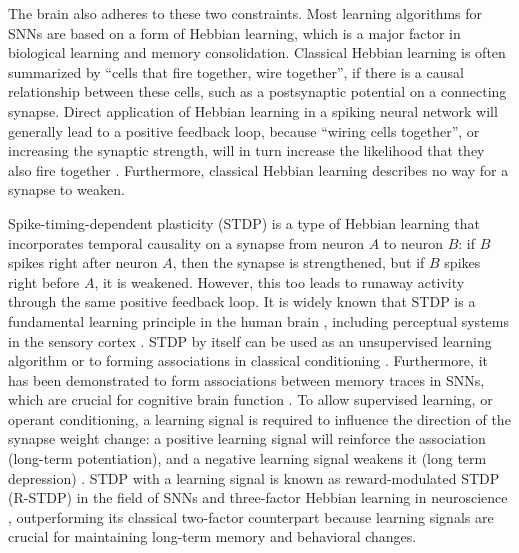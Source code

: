 The brain also adheres to these two constraints.
Most learning algorithms for SNNs are based on a form of Hebbian learning, which is a major factor in biological learning and memory consolidation.
Classical Hebbian learning is often summarized by ``cells that fire together, wire together'', if there is a causal relationship between these cells, such as a postsynaptic potential on a connecting synapse.
Direct application of Hebbian learning in a spiking neural network will generally lead to a positive feedback loop, because ``wiring cells together'', or increasing the synaptic strength, will in turn increase the likelihood that they also fire together \citep{zenke2017temporal}.
Furthermore, classical Hebbian learning describes no way for a synapse to weaken.

Spike-timing-dependent plasticity (STDP) \citep{abbott2000synaptic,caporale2008spike} is a type of Hebbian learning that incorporates temporal causality on a synapse from neuron $A$ to neuron $B$: if $B$ spikes right after neuron $A$, then the synapse is strengthened, but if $B$ spikes right before $A$, it is weakened.
However, this too leads to runaway activity through the same positive feedback loop.
It is widely known that STDP is a fundamental learning principle in the human brain \citep{kandel2000principles,caporale2008spike}, including perceptual systems in the sensory cortex \citep{huang2014associative}.
STDP by itself can be used as an unsupervised learning algorithm or to forming associations in classical conditioning \citep{diehl2015unsupervised,kim2018demonstration}.
Furthermore, it has been demonstrated to form associations between memory traces in SNNs, which are crucial for cognitive brain function \citep{pokorny2020stdp}.
To allow supervised learning, or operant conditioning, a learning signal is required to influence the direction of the synapse weight change: a positive learning signal will reinforce the association (long-term potentiation), and a negative learning signal weakens it (long term depression) \citep{lobov2020spatial}.
STDP with a learning signal is known as reward-modulated STDP (R-STDP) \citep{legenstein2008learning} in the field of SNNs and three-factor Hebbian learning in neuroscience \citep{fremaux2016neuromodulated}, outperforming its classical two-factor counterpart \citep{porr2007learning} because learning signals are crucial for maintaining long-term memory \citep{bailey2000heterosynaptic} and behavioral changes.

